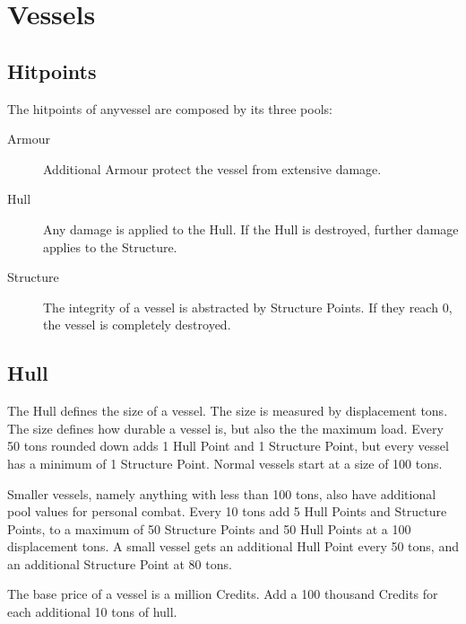 \chapter{Vessels}
\label{chap:Vessels}

\section{Hitpoints}
\label{sec:Hitpoints}

The hitpoints of anyvessel are composed by its three pools:
\begin{description}
  \item[Armour] Additional Armour protect the vessel from extensive damage.
  \item[Hull] Any damage is applied to the Hull. If the Hull is destroyed, further damage applies to the Structure.
  \item[Structure] The integrity of a vessel is abstracted by Structure Points. If they reach 0, the vessel is completely destroyed.
\end{description}

\section{Hull}
\label{sec:Hull}

The Hull defines the size of a vessel. The size is measured by displacement tons. The size defines how durable a vessel is, but also the the maximum load. Every 50 tons rounded down adds 1 Hull Point and 1 Structure Point, but every vessel has a minimum of 1 Structure Point. Normal vessels start at a size of 100 tons.

Smaller vessels, namely anything with less than 100 tons, also have additional pool values for personal combat. Every 10 tons add 5 Hull Points and Structure Points, to a maximum of 50 Structure Points and 50 Hull Points at a 100 displacement tons.
A small vessel gets an additional Hull Point every 50 tons, and an additional Structure Point at 80 tons.

The base price of a vessel is a million Credits. Add a 100 thousand Credits for each additional 10 tons of hull.

